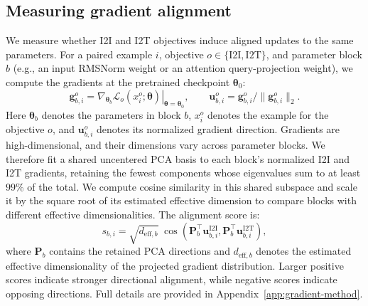 \subsection{Measuring gradient alignment}
We measure whether I2I and I2T objectives induce aligned updates to the same parameters.
For a paired example \(i\), objective \(o\in\{\mathrm{I2I},\mathrm{I2T}\}\), and parameter block \(b\) (e.g., an input RMSNorm weight or an attention query-projection weight), we compute the gradients at the pretrained checkpoint \(\boldsymbol{\theta}_0\):
\[
\mathbf{g}^{o}_{b,i}
=\left.\nabla_{\boldsymbol{\theta}_b}\mathcal L_o(x^{o}_i;\boldsymbol{\theta})\right|_{\boldsymbol{\theta}=\boldsymbol{\theta}_0},
\qquad
\mathbf{u}^{o}_{b,i}=\mathbf{g}^{o}_{b,i}/\|\mathbf{g}^{o}_{b,i}\|_2.
\]
Here \(\boldsymbol{\theta}_b\) denotes the parameters in block \(b\), \(x_i^o\) denotes the example for the objective \(o\), and \(\mathbf{u}^{o}_{b,i}\) denotes its normalized gradient direction.
Gradients are high-dimensional, and their dimensions vary across parameter blocks. We therefore fit a shared uncentered PCA basis to each block's normalized I2I and I2T gradients, retaining the fewest components whose eigenvalues sum to at least \(99\%\) of the total.
We compute cosine similarity in this shared subspace and scale it by the square root of its estimated effective dimension to compare blocks with different effective dimensionalities. The alignment score is:
\[
s_{b,i}
=
\sqrt{d_{\mathrm{eff},b}}\;
\cos\!\left(
\mathbf{P}_b^\top \mathbf{u}^{\mathrm{I2I}}_{b,i},
\mathbf{P}_b^\top \mathbf{u}^{\mathrm{I2T}}_{b,i}
\right),
\]
where \(\mathbf{P}_b\) contains the retained PCA directions and
\(d_{\mathrm{eff},b}\) denotes the estimated effective dimensionality of the projected gradient distribution.
Larger positive scores indicate stronger directional alignment, while negative scores indicate opposing directions.
Full details are provided in Appendix~\ref{app:gradient-method}. 



\begingroup
\setlength{\parskip}{4pt}
\setlength{\abovedisplayskip}{4pt plus 1pt minus 1pt}
\setlength{\belowdisplayskip}{4pt plus 1pt minus 1pt}
